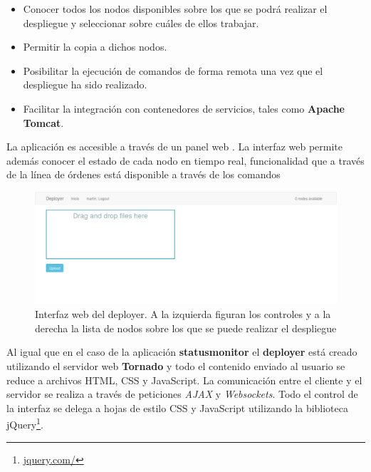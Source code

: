 \begin{itemize}
\item Conocer todos los nodos disponibles sobre los que se podrá realizar el despliegue y seleccionar sobre cuáles de ellos trabajar.
\item Permitir la copia a dichos nodos.
\item Posibilitar la ejecución de comandos de forma remota una vez que el despliegue ha sido realizado.
\item Facilitar la integración con contenedores de servicios, tales como \textbf{Apache Tomcat}.
\end{itemize}

La aplicación es accesible a través de un panel web %
. La interfaz web permite además conocer el estado de cada nodo en tiempo real, funcionalidad que a través de la línea de órdenes está disponible a través de los comandos %

\begin{figure}[H]
\centering
\includegraphics[width=\textwidth]{Chapter7/Figures/deployer}
\caption[Interfaz web del deployer]{Interfaz web del deployer. A la izquierda figuran los controles y a la derecha la lista de nodos sobre los que se puede realizar el despliegue}
\label{fig:vista_deployer}
\end{figure}

Al igual que en el caso de la aplicación \textbf{statusmonitor} el \textbf{deployer} está creado utilizando el servidor web \textbf{Tornado} y todo el contenido enviado al usuario se reduce a archivos HTML, CSS y JavaScript. La comunicación entre el cliente y el servidor se realiza a través de peticiones \textit{AJAX} y \textit{Websockets}. Todo el control de la interfaz se delega a hojas de estilo CSS y JavaScript utilizando la biblioteca jQuery\footnote{\href{https://jquery.com/}{jquery.com/}}.

